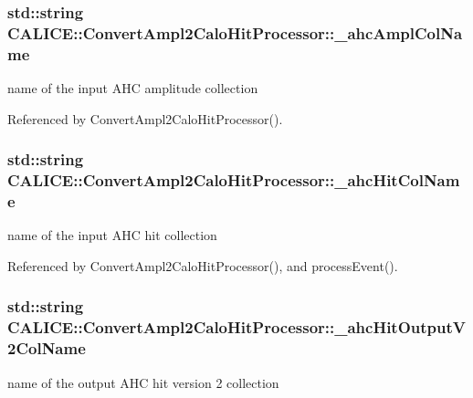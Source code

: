 \subsubsection[{\-\_\-ahc\-Ampl\-Col\-Name}]{\setlength{\rightskip}{0pt plus 5cm}std\-::string C\-A\-L\-I\-C\-E\-::\-Convert\-Ampl2\-Calo\-Hit\-Processor\-::\-\_\-ahc\-Ampl\-Col\-Name\hspace{0.3cm}{\ttfamily [protected]}}\label{classCALICE_1_1ConvertAmpl2CaloHitProcessor_a7bd1b45af294e4ecf31f566847dd061f}
name of the input A\-H\-C amplitude collection 

Referenced by Convert\-Ampl2\-Calo\-Hit\-Processor().

\subsubsection[{\-\_\-ahc\-Hit\-Col\-Name}]{\setlength{\rightskip}{0pt plus 5cm}std\-::string C\-A\-L\-I\-C\-E\-::\-Convert\-Ampl2\-Calo\-Hit\-Processor\-::\-\_\-ahc\-Hit\-Col\-Name\hspace{0.3cm}{\ttfamily [protected]}}\label{classCALICE_1_1ConvertAmpl2CaloHitProcessor_aea4cd71d349f6520f903b1fd6edb1aac}
name of the input A\-H\-C hit collection 

Referenced by Convert\-Ampl2\-Calo\-Hit\-Processor(), and process\-Event().

\subsubsection[{\-\_\-ahc\-Hit\-Output\-V2\-Col\-Name}]{\setlength{\rightskip}{0pt plus 5cm}std\-::string C\-A\-L\-I\-C\-E\-::\-Convert\-Ampl2\-Calo\-Hit\-Processor\-::\-\_\-ahc\-Hit\-Output\-V2\-Col\-Name\hspace{0.3cm}{\ttfamily [protected]}}\label{classCALICE_1_1ConvertAmpl2CaloHitProcessor_afbacc464c40229ac6c825dd7d9ac3a4c}
name of the output A\-H\-C hit version 2 collection 

